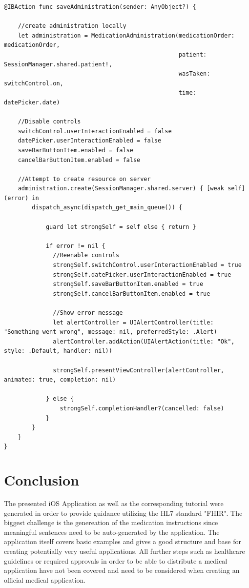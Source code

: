 \documentclass{article}
\begin{document}
\begin{verbatim}
@IBAction func saveAdministration(sender: AnyObject?) {

    //create administration locally
    let administration = MedicationAdministration(medicationOrder: medicationOrder,
                                                  patient: SessionManager.shared.patient!,
                                                  wasTaken: switchControl.on,
                                                  time: datePicker.date)

    //Disable controls
    switchControl.userInteractionEnabled = false
    datePicker.userInteractionEnabled = false
    saveBarButtonItem.enabled = false
    cancelBarButtonItem.enabled = false

    //Attempt to create resource on server
    administration.create(SessionManager.shared.server) { [weak self] (error) in
        dispatch_async(dispatch_get_main_queue()) {

            guard let strongSelf = self else { return }

            if error != nil {
              //Reenable controls
              strongSelf.switchControl.userInteractionEnabled = true
              strongSelf.datePicker.userInteractionEnabled = true
              strongSelf.saveBarButtonItem.enabled = true
              strongSelf.cancelBarButtonItem.enabled = true

              //Show error message
              let alertController = UIAlertController(title: "Something went wrong", message: nil, preferredStyle: .Alert)
              alertController.addAction(UIAlertAction(title: "Ok", style: .Default, handler: nil))

              strongSelf.presentViewController(alertController, animated: true, completion: nil)

            } else {
                strongSelf.completionHandler?(cancelled: false)
            }
        }
    }
}
\end{verbatim}

\section{Conclusion}
The presented iOS Application as well as the corresponding tutorial were generated in order to provide guidance utilizing the HL7 standard "FHIR". The biggest challenge is the genereation of the medication instructions since meaningful sentences need to be auto-generated by the application. The application itself covers basic examples and gives a good structure and base for creating potentially very useful applications. All further steps such as healthcare guidelines or required approvals in order to be able to distribute a medical application have not been covered and need to be considered when creating an official medical application.
\end{document}
